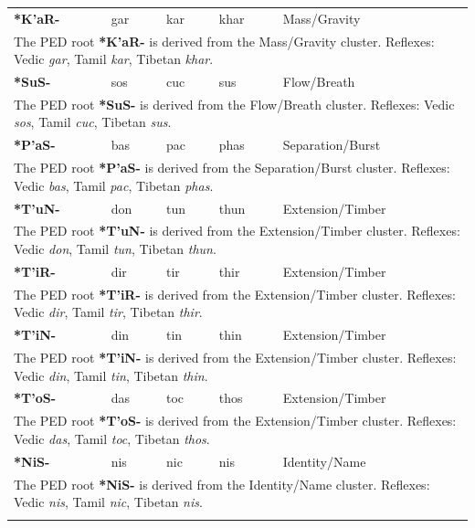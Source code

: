 \begin{longtable}{p{} p{} p{} p{} p{}}
\textbf{*K'aR-} & gar & kar & khar & Mass/Gravity \\ 
\multicolumn{5}{p{\textwidth}}{\small The PED root \textbf{*K'aR-} is derived from the Mass/Gravity cluster. Reflexes: Vedic \textit{gar}, Tamil \textit{kar}, Tibetan \textit{khar}. } \\ \addlinespace 
\textbf{*SuS-} & sos & cuc & sus & Flow/Breath \\ 
\multicolumn{5}{p{\textwidth}}{\small The PED root \textbf{*SuS-} is derived from the Flow/Breath cluster. Reflexes: Vedic \textit{sos}, Tamil \textit{cuc}, Tibetan \textit{sus}. } \\ \addlinespace 
\textbf{*P'aS-} & bas & pac & phas & Separation/Burst \\ 
\multicolumn{5}{p{\textwidth}}{\small The PED root \textbf{*P'aS-} is derived from the Separation/Burst cluster. Reflexes: Vedic \textit{bas}, Tamil \textit{pac}, Tibetan \textit{phas}. } \\ \addlinespace 
\textbf{*T'uN-} & don & tun & thun & Extension/Timber \\ 
\multicolumn{5}{p{\textwidth}}{\small The PED root \textbf{*T'uN-} is derived from the Extension/Timber cluster. Reflexes: Vedic \textit{don}, Tamil \textit{tun}, Tibetan \textit{thun}. } \\ \addlinespace 
\textbf{*T'iR-} & dir & tir & thir & Extension/Timber \\ 
\multicolumn{5}{p{\textwidth}}{\small The PED root \textbf{*T'iR-} is derived from the Extension/Timber cluster. Reflexes: Vedic \textit{dir}, Tamil \textit{tir}, Tibetan \textit{thir}. } \\ \addlinespace 
\textbf{*T'iN-} & din & tin & thin & Extension/Timber \\ 
\multicolumn{5}{p{\textwidth}}{\small The PED root \textbf{*T'iN-} is derived from the Extension/Timber cluster. Reflexes: Vedic \textit{din}, Tamil \textit{tin}, Tibetan \textit{thin}. } \\ \addlinespace 
\textbf{*T'oS-} & das & toc & thos & Extension/Timber \\ 
\multicolumn{5}{p{\textwidth}}{\small The PED root \textbf{*T'oS-} is derived from the Extension/Timber cluster. Reflexes: Vedic \textit{das}, Tamil \textit{toc}, Tibetan \textit{thos}. } \\ \addlinespace 
\textbf{*NiS-} & nis & nic & nis & Identity/Name \\ 
\multicolumn{5}{p{\textwidth}}{\small The PED root \textbf{*NiS-} is derived from the Identity/Name cluster. Reflexes: Vedic \textit{nis}, Tamil \textit{nic}, Tibetan \textit{nis}. } \\ \addlinespace 

\end{longtable}
